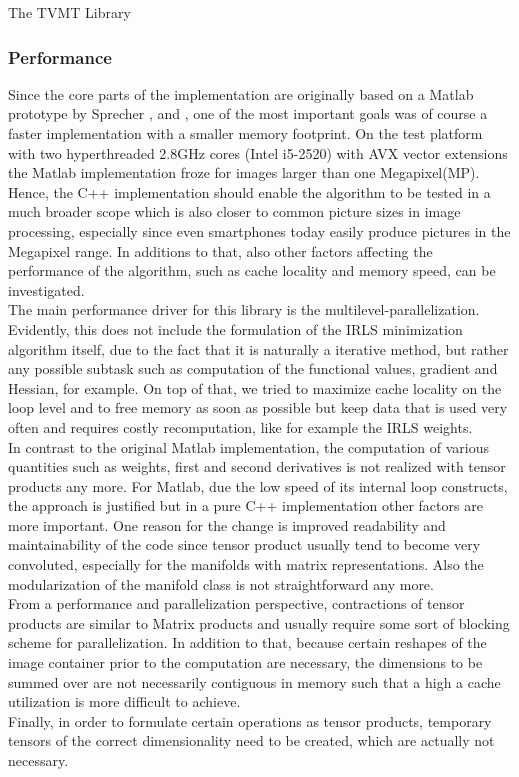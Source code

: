 \begin{chapter}{The TVMT Library}
\subsubsection{Performance} %
\label{ssub:Performance}
Since the core parts of the implementation are originally based on a Matlab prototype by Sprecher \cite{SprecherIRLS}, \cite{manuel} and \cite{mara}, one of the most important
goals was of course a faster implementation with a smaller memory footprint. On the test platform with two hyperthreaded 2.8GHz cores (Intel i5-2520) with AVX vector extensions
the Matlab implementation froze for images larger than one Megapixel(MP). Hence, the C++ implementation should enable the algorithm to be tested in a much broader scope which is
also closer to common picture sizes in image processing, especially since even smartphones today easily produce pictures in the Megapixel range.
In additions to that, also other factors affecting the performance of the algorithm, such as cache locality and memory speed, can be investigated.\\

The main performance driver for this library is the multilevel-parallelization. Evidently, this does not include the formulation of the IRLS minimization algorithm itself, due to the fact that
it is naturally a iterative method, but rather any possible subtask such as computation of the functional values, gradient and Hessian, for example. On top of that, we tried to
maximize cache locality on the loop level and to free memory as soon as possible but keep data that is used very often and requires costly recomputation, like for example the IRLS weights.\\ 

In contrast to the original Matlab implementation, the computation of various quantities such as weights, first and second derivatives is not realized with tensor products any more.
For Matlab, due the low speed of its internal loop constructs, the approach is justified but in a pure C++ implementation other factors are more important.
One reason for the change is improved readability and maintainability of the code since tensor product usually tend to become very convoluted,
especially for the manifolds with matrix representations. Also the modularization of the manifold class is not straightforward any more.\\
From a performance and parallelization perspective, contractions of tensor products are similar to Matrix products and usually require some sort of blocking scheme for parallelization.
In addition to that, because certain reshapes of the image container prior to the computation are necessary, the dimensions to be summed over are not necessarily contiguous in memory
such that a high a cache utilization is more difficult to achieve.\\
Finally, in order to formulate certain operations as tensor products, temporary tensors of the correct dimensionality need to be created, which are actually not necessary.\\


\end{chapter}
